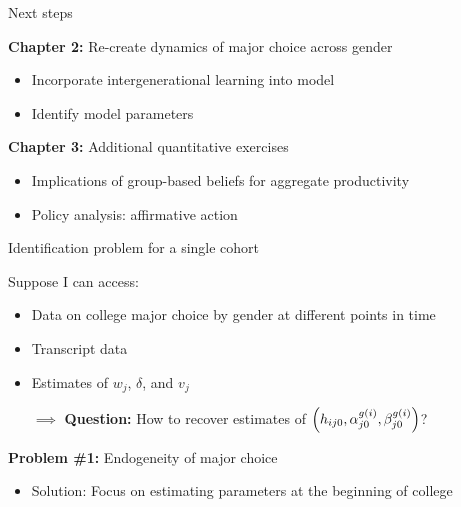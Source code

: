 \documentclass[compress, 8pt]{beamer}
\begin{document}
\begin{frame}{Next steps}\label{next_steps_overview}

\textbf{Chapter 2:} Re-create dynamics of major choice across gender
\ \hyperlink{intro_male_fields}{}
\begin{itemize}
    \item Incorporate intergenerational learning into model
    \item Identify model parameters
\end{itemize}

\vspace{4ex}
\textbf{Chapter 3:} Additional quantitative exercises
\begin{itemize}
    \item Implications of group-based beliefs for aggregate productivity
    \item Policy analysis: affirmative action
\end{itemize}

\end{frame}

\begin{frame}{Identification problem for a single cohort}

Suppose I can access:
\begin{itemize}
    \item Data on college major choice by gender at different points in time
    \item Transcript data
    \item Estimates of $w_j$, $\delta$, and $v_j$
    \item [$\implies$] \textbf{Question:} How to recover estimates of $\left( h_{ij0}, \alpha_{j0}^{g(i)}, \beta_{j0}^{g(i)} \right)$?
\end{itemize}

\vspace{3ex}
\textbf{Problem \#1:} Endogeneity of major choice
\begin{itemize}
    \item Solution: Focus on estimating parameters at the beginning of college 
\end{itemize}

\end{frame}
\end{document}
